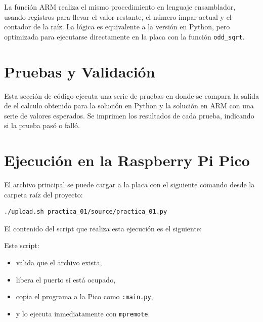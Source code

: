 \documentclass[12pt, letterpaper]{article}
\begin{document}
La función ARM realiza el mismo procedimiento en lenguaje ensamblador, usando
registros para llevar el valor restante, el número impar actual y el contador
de la raíz. La lógica es equivalente a la versión en Python, pero optimizada
para ejecutarse directamente en la placa con la función \texttt{odd\_sqrt}.



\section{Pruebas y Validación}

Esta sección de código ejecuta una serie de pruebas en donde se compara la
salida de el calculo obtenido para la solución en Python y la solución en ARM
con una serie de valores esperados. Se imprimen los resultados de cada prueba,
indicando si la prueba pasó o falló.



\section{Ejecución en la Raspberry Pi Pico}

El archivo principal se puede cargar a la placa con el siguiente comando desde
la carpeta raíz del proyecto:

\begin{lstlisting}[style=bashstyle]
./upload.sh practica_01/source/practica_01.py
\end{lstlisting}

El contenido del script que realiza esta ejecución es el siguiente:



Este script:
\begin{itemize}
    \item valida que el archivo exista,
    \item libera el puerto si está ocupado,
    \item copia el programa a la Pico como \texttt{:main.py},
    \item y lo ejecuta inmediatamente con \texttt{mpremote}.
\end{itemize}
\end{document}
